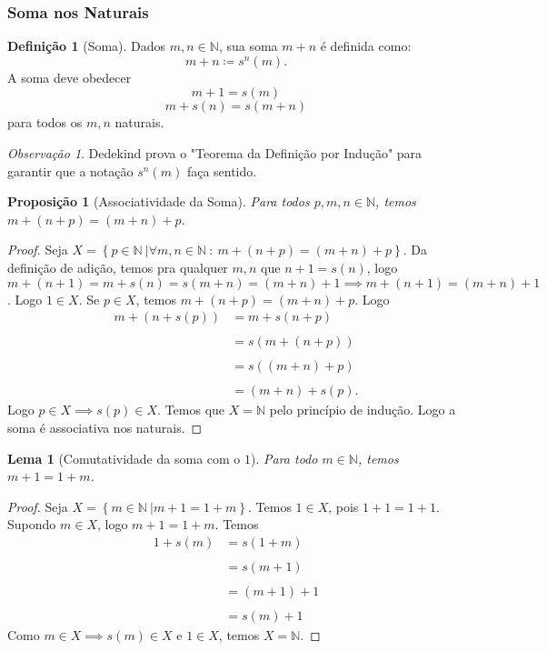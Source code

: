 \documentclass{article}
\newtheorem{prop}{Proposição}[section]
\theoremstyle{theorem}
\theoremstyle{lemma}
\newtheorem{lema}{Lema}
\theoremstyle{definition}
\newtheorem{definicao}{Definição}[section]
\theoremstyle{remark}
\newtheorem{obs}{Observação}[section]
\begin{document}
\subsubsection{Soma nos Naturais}
\begin{definicao}[Soma]
	Dados $m,n\in \mathbb{N}$, sua soma $m+n$ é definida como:$$ m+n \coloneqq s^n(m).$$ A soma deve obedecer \begin{equation} m+1 = s(m)\end{equation} \begin{equation}m +s(n) = s(m+n)\end{equation}  para todos os $m,n$ naturais.
\end{definicao}
\begin{obs}
	Dedekind prova o "Teorema da Definição por Indução" para garantir que a notação $s^n(m)$ faça sentido.
\end{obs}
\begin{prop}[Associatividade da Soma]
	Para todos $p,m,n \in \mathbb{N}$, temos $m+(n+p) = (m+n) +p$.
\end{prop}
\begin{proof}
	Seja $X = \left\{ p \in \mathbb{N} \: | \forall m,n\in \mathbb{N} \: : \: m+(n+p) = (m+n) + p \right\}$. Da definição de adição, temos pra qualquer $m,n$ que $n+1 = s(n)$, logo $m+(n+1)  = m+s(n) = s(m+n) = (m+n) +1 \implies m+(n+1) = (m+n) +1 $. Logo $1\in X$.  Se $p \in X$, temos $m+(n+p) = (m+n) +p $. Logo \begin{align*} 
		m+(n+s(p)) &= m+ s(n+p) \\~\\
		&= s\left(m+(n+p)\right) \\~\\ 
		&= s\left((m+n)+p\right) \\~\\ 
		&= (m+n) + s(p).
	\end{align*}
	Logo $p \in X \implies s(p) \in X$. Temos que $X =  \mathbb{N}$ pelo princípio de indução. Logo a soma é associativa nos naturais.
\end{proof}
\begin{lema}[Comutatividade da soma com o $1$]
	\label{lema1}
	Para todo $m \in \mathbb{N}$, temos $m+1 = 1 +m$.
\end{lema}
\begin{proof}
	Seja $X = \left\{ m \in \mathbb{N} \: |  m+1 = 1+m \right\}$. Temos $1\in X$, pois $1+1 = 1+1$. Supondo $m\in X$, logo $m+1 = 1+m$. Temos \begin{align*} 
		1+ s(m)  &= s(1+m) \\~ \\
		&= s(m+1) \\~\\
		&= (m+1) +1 \\~\\
		&= s(m)+1
	\end{align*}
	Como $m\in X \implies s(m) \in X$ e $1\in X$, temos $X= \mathbb{N}$.
\end{proof}
\end{document}
